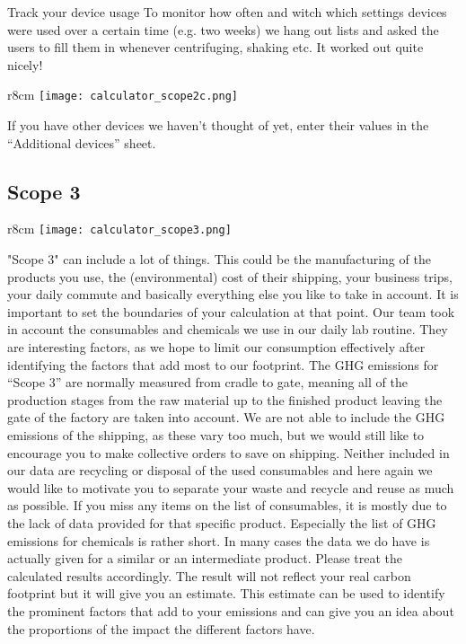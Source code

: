 \begin{suggest}{Track your device usage}
	To monitor how often and witch which settings devices were used over a certain time (e.g. two weeks) we hang out lists and asked the users to fill them in whenever centrifuging, shaking etc. It worked out quite nicely!
\end{suggest}

\begin{wrapfigure}{r}{8cm}
	\centering
	\texttt{[image: calculator\_scope2c.png]}%
	\caption{If you used additional devices we haven't thought of, enter their data here.}%
\end{wrapfigure}
	
	
If you have other devices we haven’t thought of yet, enter their values in the “Additional devices” sheet.

\subsection{Scope 3}
\begin{wrapfigure}{r}{8cm}
	\centering
	\texttt{[image: calculator\_scope3.png]}%
	\caption{Take into account the consumables and chemicals you use in your daily working routine in Scope 3.}%
\end{wrapfigure}

"Scope 3" can include a lot of things. This could be the manufacturing of the products you use, the (environmental) cost of their shipping, your business trips, your daily commute and basically everything else you like to take in account. It is important to set the boundaries of your calculation at that point. Our team took in account the consumables and chemicals we use in our daily lab routine. They are interesting factors, as we hope to limit our consumption effectively after identifying the factors that add most to our footprint. The GHG emissions for “Scope 3” are normally measured from cradle to gate, meaning all of the production stages from the raw material up to the finished product leaving the gate of the factory are taken into account. We are not able to include the GHG emissions of the shipping, as these vary too much, but we would still like to encourage you to make collective orders to save on shipping. Neither included in our data are recycling or disposal of the used consumables and here again we would like to motivate you to separate your waste and recycle and reuse as much as possible. If you miss any items on the list of consumables, it is mostly due to the lack of data provided for that specific product. Especially the list of GHG emissions for chemicals is rather short. In many cases the data we do have is actually given for a similar or an intermediate product. Please treat the calculated results accordingly. The result will not reflect your real carbon footprint but it will give you an estimate. This estimate can be used to identify the prominent factors that add to your emissions and can give you an idea about the proportions of the impact the different factors have.


